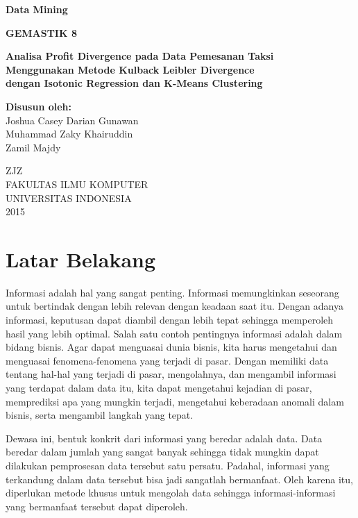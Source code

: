\documentclass{article}
\begin{document}
\begin{titlepage}

\begin{center}
	
\textbf{Data Mining}

\vspace{0.5cm}
\textbf{GEMASTIK 8}

\vspace{1.5cm}

\textbf{Analisa Profit Divergence pada Data Pemesanan Taksi\\ Menggunakan Metode Kulback Leibler Divergence\\dengan Isotonic Regression dan K-Means Clustering}

\vspace{1.5cm}
\textbf{Disusun oleh:}\\
Joshua Casey Darian Gunawan\\
Muhammad Zaky Khairuddin\\
Zamil Majdy
\vspace{1.5cm}

\vspace{0.8cm}
ZJZ\\
FAKULTAS ILMU KOMPUTER\\
UNIVERSITAS INDONESIA\\
2015
\end{center}
\end{titlepage}

\tableofcontents
\newpage

\section{Latar Belakang}

Informasi adalah hal yang sangat penting. Informasi memungkinkan seseorang untuk bertindak dengan lebih relevan dengan keadaan saat itu. Dengan adanya informasi, keputusan dapat diambil dengan lebih tepat sehingga memperoleh hasil yang lebih optimal. Salah satu contoh pentingnya informasi adalah dalam bidang bisnis. Agar dapat menguasai dunia bisnis, kita harus mengetahui dan menguasai fenomena-fenomena yang terjadi di pasar. Dengan memiliki data tentang hal-hal yang terjadi di pasar, mengolahnya, dan mengambil informasi yang terdapat dalam data itu, kita dapat mengetahui kejadian di pasar, memprediksi apa yang mungkin terjadi, mengetahui keberadaan anomali dalam bisnis, serta mengambil langkah yang tepat.

Dewasa ini, bentuk konkrit dari informasi yang beredar adalah data. Data beredar dalam jumlah yang sangat banyak sehingga tidak mungkin dapat dilakukan pemprosesan data tersebut satu persatu. Padahal, informasi yang terkandung dalam data tersebut bisa jadi sangatlah bermanfaat. Oleh karena itu, diperlukan metode khusus untuk mengolah data sehingga informasi-informasi yang bermanfaat tersebut dapat diperoleh.
\end{document}
